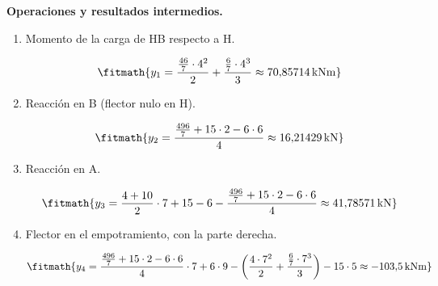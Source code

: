 \noindent\textbf{Operaciones y resultados intermedios.}

\begin{enumerate}

\item Momento de la carga de HB respecto a H.

\[\fitmath{y_{1}=\frac{\frac{46}{7}\cdot {4}^{2}}{2}+\frac{\frac{6}{7}\cdot {4}^{3}}{3}\approx 70{,}85714\,\mathrm{kN m}}\]

\item Reacción en B (flector nulo en H).

\[\fitmath{y_{2}=\frac{\frac{496}{7}+15\cdot 2-6\cdot 6}{4}\approx 16{,}21429\,\mathrm{kN}}\]

\item Reacción en A.

\[\fitmath{y_{3}=\frac{4+10}{2}\cdot 7+15-6-\frac{\frac{496}{7}+15\cdot 2-6\cdot 6}{4}\approx 41{,}78571\,\mathrm{kN}}\]

\item Flector en el empotramiento, con la parte derecha.

\[\fitmath{y_{4}=\frac{\frac{496}{7}+15\cdot 2-6\cdot 6}{4}\cdot 7+6\cdot 9-\left(\frac{4\cdot {7}^{2}}{2}+\frac{\frac{6}{7}\cdot {7}^{3}}{3}\right)-15\cdot 5\approx -103{,}5\,\mathrm{kN m}}\]

\end{enumerate}
